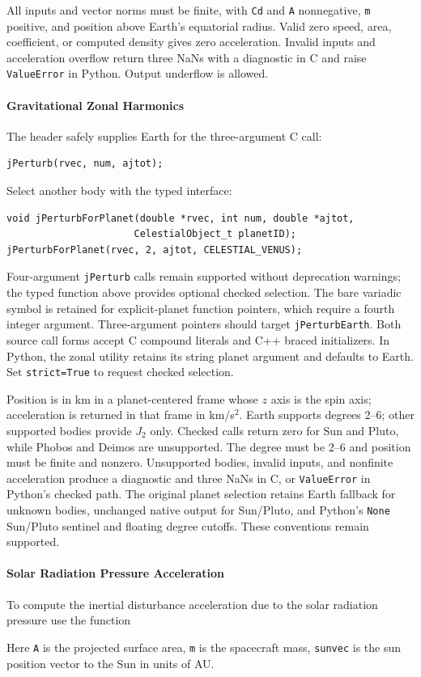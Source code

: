 All inputs and vector norms must be finite, with {\tt Cd} and {\tt A} nonnegative,
{\tt m} positive, and position above Earth's equatorial radius.  Valid zero speed,
area, coefficient, or computed density gives zero acceleration.  Invalid inputs
and acceleration overflow return three NaNs with a diagnostic in C and raise
{\tt ValueError} in Python.  Output underflow is allowed.

\paragraph{Gravitational Zonal Harmonics}
The header safely supplies Earth for the three-argument C call:
\begin{verbatim}
jPerturb(rvec, num, ajtot);
\end{verbatim}
Select another body with the typed interface:
\begin{verbatim}
void jPerturbForPlanet(double *rvec, int num, double *ajtot,
                      CelestialObject_t planetID);
jPerturbForPlanet(rvec, 2, ajtot, CELESTIAL_VENUS);
\end{verbatim}
Four-argument {\tt jPerturb} calls remain supported without deprecation warnings;
the typed function above provides optional checked selection. The bare variadic symbol is
retained for explicit-planet function pointers, which require a fourth integer
argument. Three-argument pointers should target {\tt jPerturbEarth}.
Both source call forms accept C compound literals and C++ braced initializers.
In Python, the zonal utility retains its string planet argument and defaults
to Earth. Set {\tt strict=True} to request checked selection.

Position is in km in a planet-centered frame whose $z$ axis is the spin axis;
acceleration is returned in that frame in km/s$^2$. Earth supports degrees
2--6; other supported bodies provide $J_2$ only. Checked calls return zero for
Sun and Pluto, while Phobos and Deimos are unsupported. The degree must be
2--6 and position must be finite and nonzero. Unsupported bodies, invalid
inputs, and nonfinite acceleration produce a diagnostic and three NaNs in C,
or {\tt ValueError} in Python's checked path. The original
planet selection retains Earth fallback for unknown bodies, unchanged native
output for Sun/Pluto, and Python's {\tt None} Sun/Pluto sentinel and floating
degree cutoffs. These conventions remain supported.

\paragraph{Solar Radiation Pressure Acceleration}
To compute the inertial disturbance acceleration due to the solar radiation pressure use  the function\\

Here {\tt A} is the projected surface area, {\tt m} is the spacecraft mass, {\tt sunvec} is the sun position vector to the Sun in units of AU.

